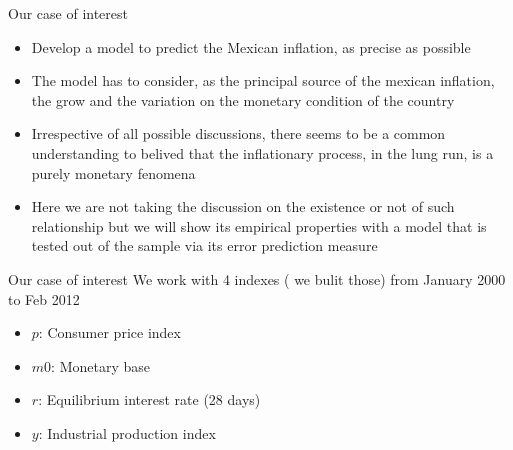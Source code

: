 \documentclass{beamer}
\newcommand{\?}{?`}
\begin{document}
\begin{frame}{Our case of interest}
  \begin{itemize}
    \item Develop a model to predict the Mexican inflation, as precise as possible
    \item The model has to consider, as the principal source of the mexican inflation, the grow and the variation on the monetary condition of the country
    \item Irrespective of all possible discussions, there seems to be a common understanding to belived that the inflationary process, in the lung run, is a purely monetary fenomena
    \item Here we are not taking the discussion on the existence or not of such relationship but we will show its empirical properties with a model that is tested out of the sample via its error prediction measure
    
  \end{itemize}
\end{frame}

\begin{frame}{Our case of interest}
  We work with 4 indexes ( we bulit those) from January 2000 to Feb 2012
  \bigskip
  
  \begin{itemize}
    \item $p$: Consumer price index  
    \bigskip
    \item $m0$: Monetary base 
      \bigskip
    \item $r$: Equilibrium interest rate (28 days)
      \bigskip
    \item $y$: Industrial production index 
  \end{itemize}
\end{frame}
\end{document}
